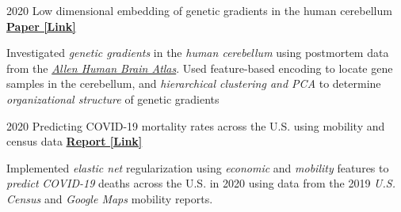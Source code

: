 \begin{cventries}
  \cventry
    {2020} %
    {Low dimensional embedding of genetic gradients in the human cerebellum} %
    {\href{https://papers.ssrn.com/sol3/papers.cfm?abstract_id=3797269}{\textbf{Paper [Link]}}}
    {}
    {
      \begin{cvitems} %
      	\item {Investigated \textit{genetic gradients} in the \textit{human cerebellum} using postmortem data from the \href{https://human.brain-map.org/}{\textit{Allen Human Brain Atlas}}. Used feature-based encoding to locate gene samples in the cerebellum, and \textit{hierarchical clustering and PCA} to determine \textit{organizational structure} of genetic gradients}
      \end{cvitems}
    }
    
  \cventry
    {2020} %
    {Predicting COVID-19 mortality rates across the U.S. using mobility and census data} %
    {\href{https://drive.google.com/file/d/1l9TLGLmstkJsvOJQPxHe_f35b4fEkDU4/view}{\textbf{Report [Link]}}}
    {}
    {
      \begin{cvitems} %
      	\item {Implemented \textit{elastic net} regularization using \textit{economic} and \textit{mobility} features to \textit{predict} \textit{COVID-19} deaths across the U.S. in 2020 using data from the 2019 \textit{U.S. Census} and \textit{Google Maps} mobility reports.}
      \end{cvitems}
    }
    
\end{cventries}
